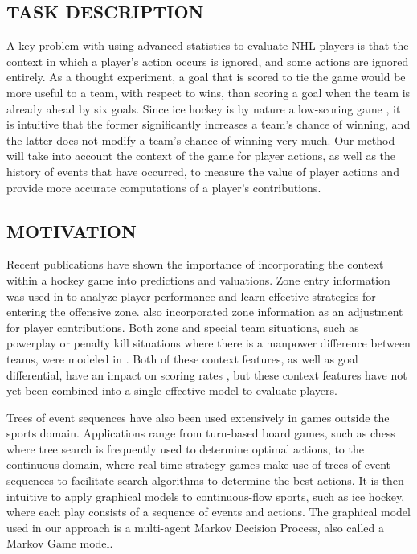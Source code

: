 \documentclass[]{article}
\begin{document}
\subsection{TASK DESCRIPTION}

A key problem with using advanced statistics to evaluate NHL players is that the context in which a player's action occurs is ignored, and some actions are ignored entirely. As a thought experiment, a goal that is scored to tie the game would be more useful to a team, with respect to wins, than scoring a goal when the team is already ahead by six goals. Since ice hockey is by nature a low-scoring game \citep{Lock2009}, it is intuitive that the former significantly increases a team's chance of winning, and the latter does not modify a team's chance of winning very much. Our method will take into account the context of the game for player actions, as well as the history of events that have occurred, to measure the value of player actions and provide more accurate computations of a player's contributions.


\subsection{MOTIVATION}

Recent publications have shown the importance of incorporating the context within a hockey game into predictions and valuations. Zone entry information was used in \citep{Tulsky2013} to analyze player performance and learn effective strategies for entering the offensive zone. \citep{Schuckers2013} also incorporated zone information as an adjustment for player contributions. Both zone and special team situations, such as powerplay or penalty kill situations where there is a manpower difference between teams, were modeled in \citep{Macdonald2012}. Both of these context features, as well as goal differential, have an impact on scoring rates \citep{Thomas2012}, but these context features have not yet been combined into a single effective model to evaluate players.

Trees of event sequences have also been used extensively in games outside the sports domain. Applications range from turn-based board games, such as chess \citep{Berliner1979} where tree search is frequently used to determine optimal actions, to the continuous domain, where real-time strategy games \citep{Churchill2013} make use of trees of event sequences to facilitate search algorithms to determine the best actions. It is then intuitive to apply graphical models to continuous-flow sports, such as ice hockey, where each play consists of a sequence of events and actions. The graphical model used in our approach is a multi-agent Markov Decision Process, also called a Markov Game model.
\end{document}
